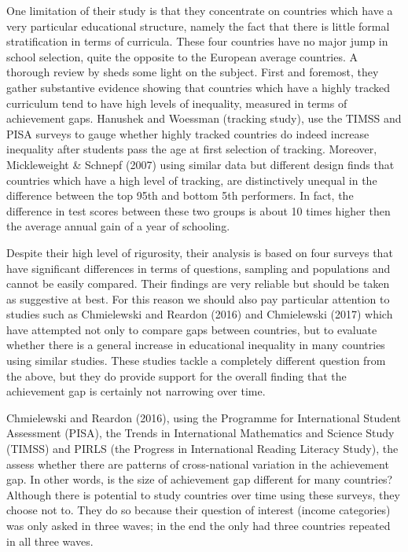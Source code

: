 \documentclass[11pt, a4paper]{article}\usepackage[]{graphicx}\usepackage[]{color}
\begin{document}
One limitation of their study is that they concentrate on countries which have a very particular educational structure, namely the fact that there is little formal stratification in terms of curricula. These four countries have no major jump in school selection, quite the opposite to the European average countries. A thorough review by \citet{werfhorst_mijs} sheds some light on the subject. First and foremost, they gather substantive evidence showing that countries which have a highly tracked curriculum tend to have high levels of inequality, measured in terms of achievement gaps. Hanushek and Woessman (tracking study), use the TIMSS and PISA surveys to gauge whether highly tracked countries do indeed increase inequality after students pass the age at first selection of tracking. Moreover, Mickleweight \& Schnepf (2007) using similar data but different design finds that countries which have a high level of tracking, are distinctively unequal in the difference between the top 95th and bottom 5th performers. In fact, the difference in test scores between these two groups is about 10 times higher then the average annual gain of a year of schooling.

Despite their high level of rigurosity, their analysis is based on four surveys that have significant differences in terms of questions, sampling and populations and cannot be easily compared. Their findings are very reliable but should be taken as suggestive at best.  For this reason we should also pay particular attention to studies such as Chmielewski and Reardon (2016) and Chmielewski (2017) which have attempted not only to compare gaps between countries, but to evaluate whether there is a general increase in educational inequality in many countries using similar studies. These studies tackle a completely different question from the above, but they do provide support for the overall finding that the achievement gap is certainly not narrowing over time.

Chmielewski and Reardon (2016), using the Programme for International Student Assessment (PISA), the Trends in International Mathematics and Science Study (TIMSS) and PIRLS (the Progress in International Reading Literacy Study), the assess whether there are patterns of cross-national variation in the achievement gap. In other words, is the size of achievement gap different for many countries? Although there is potential to study countries over time using these surveys, they choose not to. They do so because their question of interest (income categories) was only asked in three waves; in the end the only had three countries repeated in all three waves. 
\end{document}

